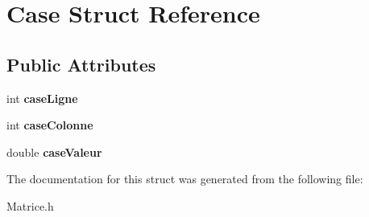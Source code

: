 \hypertarget{structCase}{\section{Case Struct Reference}
\label{structCase}
}
\subsection*{Public Attributes}
\begin{DoxyCompactItemize}
\item 
\hypertarget{structCase_a8ba07d21dac8f757b3716bf6aed3e602}{int {\bfseries case\-Ligne}}\label{structCase_a8ba07d21dac8f757b3716bf6aed3e602}

\item 
\hypertarget{structCase_ae426d726d737d7eea3877c0686ebe654}{int {\bfseries case\-Colonne}}\label{structCase_ae426d726d737d7eea3877c0686ebe654}

\item 
\hypertarget{structCase_a646252a1aa4c2186ba20ebf5ea76aa7f}{double {\bfseries case\-Valeur}}\label{structCase_a646252a1aa4c2186ba20ebf5ea76aa7f}

\end{DoxyCompactItemize}


The documentation for this struct was generated from the following file\-:\begin{DoxyCompactItemize}
\item 
Matrice.\-h\end{DoxyCompactItemize}
